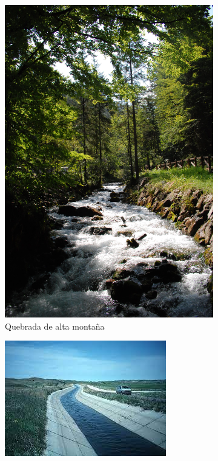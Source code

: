 \documentclass[11pt, oneside]{article}
\begin{document}
\begin{figure}
     \centering
     \begin{subfigure}[b]{0.48\textwidth}
         \centering
         \includegraphics[width=\textwidth]{fig2a}
         \caption{Quebrada de alta montaña}
         \label{fig2a}
     \end{subfigure}
     \hfill
     \begin{subfigure}[b]{0.48\textwidth}
         \centering
         \includegraphics[width=\textwidth]{fig2b}

\end{subfigure}
\end{figure}
\end{document}
